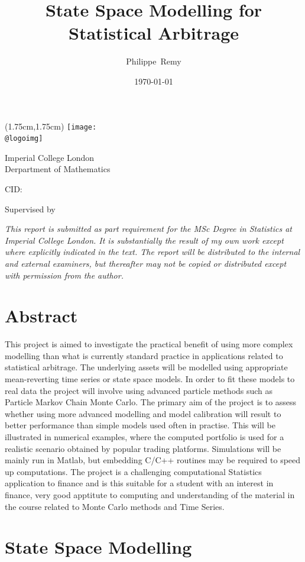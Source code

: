 \documentclass[11pt,a4,twosided,singlespacing,titlepagenumber=on]{scrreprt}
\title{State Space Modelling for Statistical Arbitrage}
\author{Philippe~Remy}
\date{\today}
\makeatletter
\numberwithin{equation}{chapter} %
\theoremstyle{remark}
\renewcommand{\maketitle}{
\begin{titlepage}
\ifdefined\@logoimg
\begin{textblock*}{8cm}(1.75cm,1.75cm)
\texttt{[image: \\@logoimg]}
\end{textblock*}
\vspace*{1cm}
\else
\fi
\begin{center}
\vspace*{\stretch{0.1}}
Imperial College London\\
Derpartment of Mathematics\par
\vspace*{\stretch{1}} %
{\titlefont\Huge \@title\par} %
\vspace*{\stretch{2}}
{\Large \@author \par}
\vspace*{1em}
{\large CID: \@CID \par}
\vspace*{\stretch{0.5}}
{\large Supervised by \@supervisor \par}
\vspace*{\stretch{3}}
{\Large \@date \par}
\vspace*{\stretch{1}}

\textit{This report is submitted as part requirement for the MSc Degree in Statistics at Imperial College London. It is substantially the result of my own work except where explicitly indicated in the text.
The report will be distributed to the internal and external examiners, but thereafter may not be
copied or distributed except with permission from the author.}
\vspace*{\stretch{0.1}}
\end{center}%
\end{titlepage}%
}
\renewenvironment{abstract}%
{\chapter*{Abstract}\thispagestyle{plain}}%
{\clearpage}
\newenvironment{myquote}%
{\begin{quote}{\Large{}``}}%
{\ifhmode\unskip\fi{\Large{}''}\end{quote}}
\makeatother
\begin{document}
\maketitle

\declaration

\begin{abstract}
This project is aimed to investigate the practical benefit of using more complex modelling than what is currently standard practice in applications related to statistical arbitrage. The underlying assets will be modelled using appropriate mean-reverting time series or state space models. In order to fit these models to real data the project will involve using advanced particle methods such as Particle Markov Chain Monte Carlo. The primary aim of the project is to assess whether using more advanced modelling and model calibration will result to better performance than simple models used often in practise. This will be illustrated in numerical examples, where the computed portfolio is used for a realistic scenario obtained by popular trading platforms. Simulations will be mainly run in Matlab, but embedding C/C++ routines may be required to speed up computations. The project is a challenging computational Statistics application to finance and is this suitable for a student with an interest in finance, very good apptitute to computing and understanding of the material in the course related to Monte Carlo methods and Time Series.
\end{abstract}
\newpage

\renewcommand{\contentsname}{Table of Contents}
\tableofcontents
\newpage



\chapter{State Space Modelling}
\end{document}
